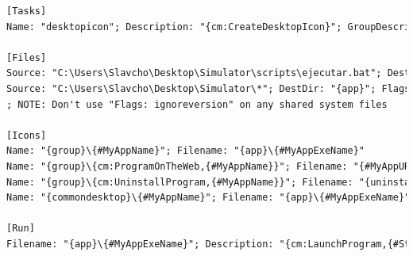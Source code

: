 \begin{lstlisting}[language=xml, frame=single]
[Tasks]
Name: "desktopicon"; Description: "{cm:CreateDesktopIcon}"; GroupDescription: "{cm:AdditionalIcons}"; Flags: unchecked

[Files]
Source: "C:\Users\Slavcho\Desktop\Simulator\scripts\ejecutar.bat"; DestDir: "{app}"; Flags: ignoreversion
Source: "C:\Users\Slavcho\Desktop\Simulator\*"; DestDir: "{app}"; Flags: ignoreversion recursesubdirs createallsubdirs
; NOTE: Don't use "Flags: ignoreversion" on any shared system files

[Icons]
Name: "{group}\{#MyAppName}"; Filename: "{app}\{#MyAppExeName}"
Name: "{group}\{cm:ProgramOnTheWeb,{#MyAppName}}"; Filename: "{#MyAppURL}"
Name: "{group}\{cm:UninstallProgram,{#MyAppName}}"; Filename: "{uninstallexe}"
Name: "{commondesktop}\{#MyAppName}"; Filename: "{app}\{#MyAppExeName}"; Tasks: desktopicon

[Run]
Filename: "{app}\{#MyAppExeName}"; Description: "{cm:LaunchProgram,{#StringChange(MyAppName, '&', '&&')}}"; Flags: shellexec postinstall skipifsilent
\end{lstlisting}
